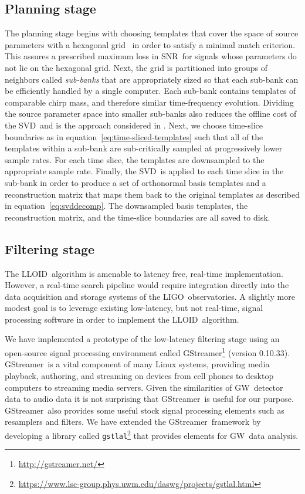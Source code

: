 \documentclass[preprint2]{aastex}
\newcommand{\GW}{GW}%
\newcommand{\LIGO}{LIGO}%
\newcommand{\SNR}{SNR}%
\newcommand{\SVD}{SVD}%
\newcommand{\gstlal}{{\tt gstlal}}
\newcommand{\gstreamer}{GStreamer}
\newcommand{\lloid}{LLOID}%
\begin{document}
\subsection{Planning stage}

The planning stage begins with choosing templates that cover the space of
source parameters with a hexagonal grid~\citep{PhysRevD.76.102004} in order to
satisfy a minimal match criterion.  This assures a prescribed maximum loss in
\SNR\ for signals whose parameters do not lie on the hexagonal grid.  Next, the
grid is partitioned into groups of neighbors called \emph{sub-banks} that
are appropriately sized so that each sub-bank can be efficiently handled by a
single computer.  Each sub-bank contains templates of comparable chirp mass, and
therefore similar time-frequency evolution.  Dividing the source
parameter space into smaller sub-banks also reduces the offline cost of the
\SVD\ and is the approach considered in \citet{Cannon:2010p10398}.  Next, we choose
time-slice boundaries as in equation~\eqref{eq:time-sliced-templates} such that all
of the templates within a sub-bank are sub-critically sampled at progressively lower
sample rates.  For each time slice, the templates are downsampled to the
appropriate sample rate.  Finally, the \SVD\ is applied to each time slice in
the sub-bank in order to produce a set of orthonormal basis templates and a
reconstruction matrix that maps them back to the original templates as
described in equation~\eqref{eq:svddecomp}.  The downsampled basis templates,
the reconstruction matrix, and the time-slice boundaries are all saved to disk.

\subsection{Filtering stage}

The \lloid\ algorithm is amenable to latency free, real-time implementation.  However, a real-time search pipeline would require integration directly into the data acquisition and storage systems of the \LIGO\ observatories.  A slightly more 
modest goal is to leverage existing low-latency, but not real-time, signal processing software in order to implement
the \lloid\ algorithm.

We have implemented a prototype of the low-latency filtering stage using an
open-source signal processing environment called
\gstreamer\footnote{\url{http://gstreamer.net/}} (version 0.10.33).
\gstreamer\ is a vital component of many Linux systems, providing media
playback, authoring, and streaming on devices from cell phones to desktop
computers to streaming media servers.  Given the similarities of
\GW\ detector data to audio data it is not surprising that
\gstreamer\ is useful for our purpose. \gstreamer\ also provides some useful
stock signal processing elements such as resamplers and filters.  We have
extended the \gstreamer\ framework by developing a library called
\gstlal\footnote{\url{https://www.lsc-group.phys.uwm.edu/daswg/projects/gstlal.html}}
that provides elements for \GW\ data analysis.
\end{document}
